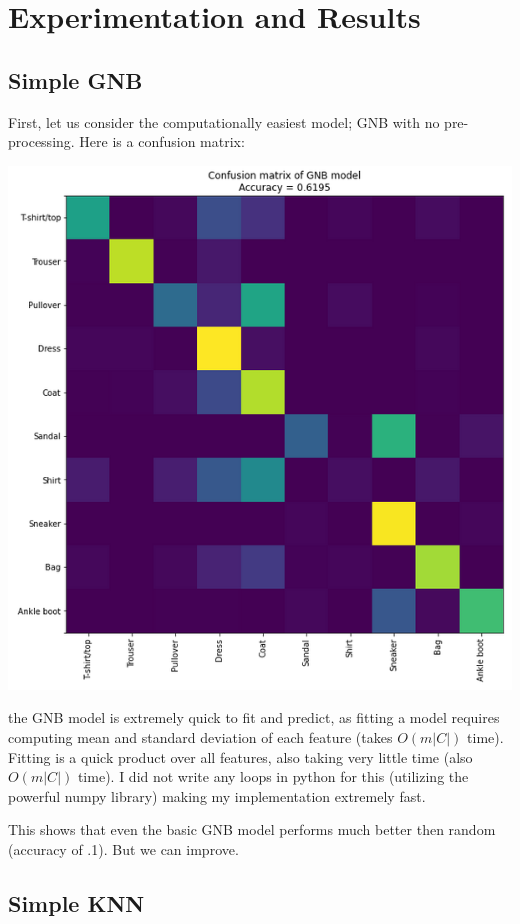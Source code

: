 \documentclass[11pt]{article}
\begin{document}
\section{Experimentation and Results}
\label{sec:orgda0f67e}

\subsection{Simple GNB}
\label{sec:org37e2ba9}

First, let us consider the computationally easiest model; GNB with no pre-processing. Here is a confusion matrix:
\begin{center}
\includegraphics[width=.9\linewidth]{.images/Experimentation_and_Results/2020-10-21_19-58-52_screenshot.png}
\end{center}
the GNB model is extremely quick to fit and predict, as fitting a model requires computing mean and standard deviation of each feature (takes \(O\left(m|C|\right)\) time). Fitting is a quick product over all features, also taking very little time (also \(O\left(m |C|\right)\) time). I did not write any loops in python for this (utilizing the powerful numpy library) making my implementation extremely fast.

This shows that even the basic GNB model performs much better then random (accuracy of .1). But we can improve.

\subsection{Simple KNN}
\label{sec:org6b9b902}
\end{document}
